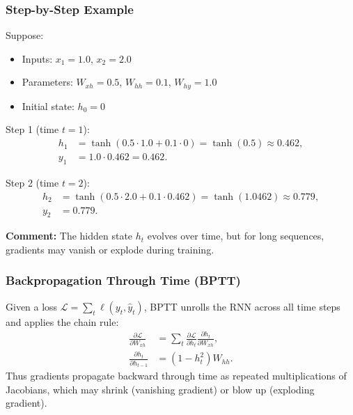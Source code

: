 \documentclass[11pt]{article}
\theoremstyle{remark}
\begin{document}
\subsubsection*{Step-by-Step Example}
Suppose:
\begin{itemize}
    \item Inputs: $x_1 = 1.0$, $x_2 = 2.0$
    \item Parameters: $W_{xh}=0.5$, $W_{hh}=0.1$, $W_{hy}=1.0$
    \item Initial state: $h_0=0$
\end{itemize}

\noindent Step 1 (time $t=1$):
\begin{align*}
    h_1 &= \tanh(0.5 \cdot 1.0 + 0.1 \cdot 0) = \tanh(0.5) \approx 0.462, \\
    y_1 &= 1.0 \cdot 0.462 = 0.462.
\end{align*}

Step 2 (time $t=2$):
\begin{align*}
    h_2 &= \tanh(0.5 \cdot 2.0 + 0.1 \cdot 0.462) = \tanh(1.0462) \approx 0.779, \\
    y_2 &= 0.779.
\end{align*}

\noindent \textbf{Comment:} The hidden state $h_t$ evolves over time, but for long sequences, gradients may vanish or explode during training.

\subsubsection*{Backpropagation Through Time (BPTT)}
Given a loss $\mathcal{L} = \sum_{t} \ell(y_t, \hat{y}_t)$, BPTT unrolls the RNN across all time steps and applies the chain rule:
\begin{align}
    \frac{\partial \mathcal{L}}{\partial W_{xh}} &= \sum_{t} \frac{\partial \mathcal{L}}{\partial h_t} \frac{\partial h_t}{\partial W_{xh}}, \\
    \frac{\partial h_t}{\partial h_{t-1}} &= (1-h_t^2) W_{hh}.
\end{align}
Thus gradients propagate backward through time as repeated multiplications of Jacobians, which may shrink (vanishing gradient) or blow up (exploding gradient).
\end{document}
